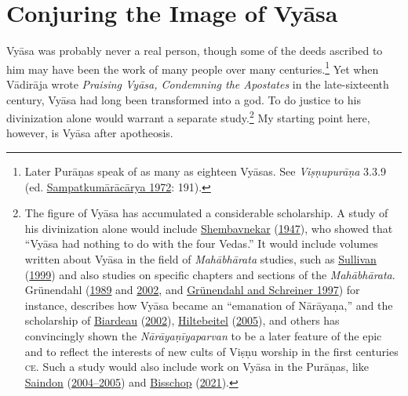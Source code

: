 \section{Conjuring the Image of Vyāsa}
      Vyāsa was probably never a real person, though some of the deeds ascribed to him may have been the work of many people over many centuries.\footnote{%
Later Purāṇas speak of as many as eighteen Vyāsas. See \emph{{Viṣṇupurāṇa}} 3.3.9 (ed. \hyperref[Visnupurana]{Sampatkumārācārya 1972}: 191).
}
 Yet when Vādirāja wrote \emph{Praising Vyāsa, Condemning the Apostates} in the late-sixteenth century, Vyāsa had long been transformed into a god. To do justice to his divinization alone would warrant a separate study.\footnote{%
The figure of Vyāsa has accumulated a considerable scholarship. A study of his divinization alone would include \hyperref[Shembavnekar1947]{Shembavnekar} (\hyperref[Shembavnekar1947]{1947}), who showed that “Vyāsa had nothing to do with the four Vedas.” It would include volumes written about Vyāsa in the field of \emph{Mahābhārata} studies, such as \hyperref[Sullivan1999]{Sullivan} (\hyperref[Sullivan1999]{1999}) and also studies on specific chapters and sections of the \emph{Mahābhārata}. Grünendahl (\hyperref[Gruenendahl1989]{1989} and \hyperref[Gruenendahl2002]{2002}, and \hyperref[Gruenendahl1997]{Grünendahl and Schreiner 1997}) for instance, describes how Vyāsa became an “emanation of Nārāyaṇa,” and the scholarship of \hyperref[Biardeau2002]{Biardeau} (\hyperref[Biardeau2002]{2002}), \hyperref[Hiltebeitel2005]{Hiltebeitel} (\hyperref[Hiltebeitel2005]{2005}), and others has convincingly shown the \emph{{Nārāyaṇīyaparvan}} to be a later feature of the epic and to reflect the interests of new cults of Viṣṇu worship in the first centuries \textsc{ce}. Such a study would also include work on Vyāsa in the Purāṇas, like \hyperref[Saindon20042005]{Saindon} (\hyperref[Saindon20042005]{2004–2005}) and \hyperref[Bisschop2021]{Bisschop} (\hyperref[Bisschop2021]{2021}). 
}
 My starting point here, however, is Vyāsa after apotheosis.


